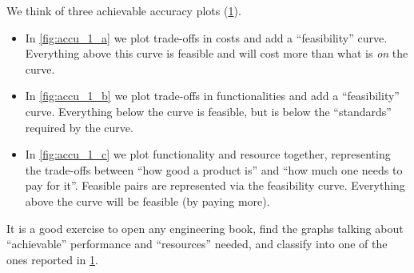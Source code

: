 \begin{figure}[h]
    \centering
    \hfill
    \hfill
    \hfill
    \caption{}
\end{figure}

\begin{figure}[b]
    \centering
    \caption{}
    \label{fig:accu_res_fun}
\end{figure}

We think of three achievable accuracy plots (\cref{fig:accu_res_fun}).

\begin{itemize}
    \item
          In \cref{fig:accu_1_a} we plot trade-offs in costs and add a ``feasibility'' curve.
          Everything above this curve is feasible and will cost more than what is \emph{on} the curve.
    \item
          In \cref{fig:accu_1_b} we plot trade-offs in functionalities and add a ``feasibility'' curve.
          Everything below the curve is feasible, but is below the ``standards'' required by the curve.
    \item
          In \cref{fig:accu_1_c} we plot functionality and resource together, representing the trade-offs between ``how good a product is'' and ``how much one needs to pay for it''.
          Feasible pairs are represented via the feasibility curve.
          Everything above the curve will be feasible (by paying more).
\end{itemize}

It is a good exercise to open any engineering book, find the graphs talking about ``achievable'' performance and ``resources'' needed, and classify into one of the ones reported in \cref{fig:accu_res_fun}.


